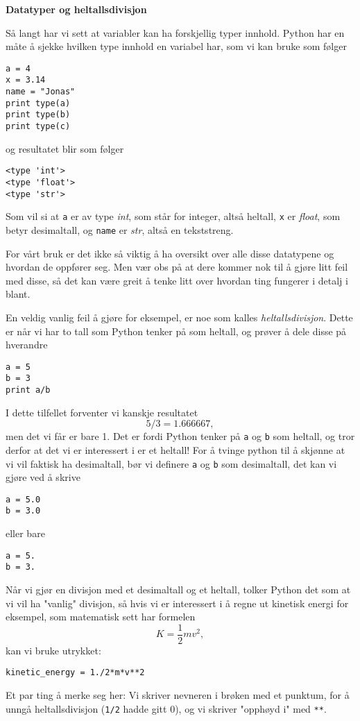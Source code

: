 \documentclass[a4paper, 11pt, notitlepage, english]{article}
\begin{document}
\textbf{Datatyper og heltallsdivisjon}

Så langt har vi sett at variabler kan ha forskjellig typer innhold. Python har en måte å sjekke hvilken type innhold en variabel har, som vi kan bruke som følger
\begin{lstlisting}
a = 4
x = 3.14
name = "Jonas"
print type(a)
print type(b)
print type(c)
\end{lstlisting}
\vspace{-0.3cm}
og resultatet blir som følger
\begin{lstlisting}
<type 'int'>
<type 'float'>
<type 'str'>
\end{lstlisting}
\vspace{-0.3cm}
Som vil si at \verb+a+ er av type \emph{int}, som står for integer, altså heltall, \verb+x+ er \emph{float}, som betyr desimaltall, og \verb+name+ er \emph{str}, altså en tekststreng.

For vårt bruk er det ikke så viktig å ha oversikt over alle disse datatypene og hvordan de oppfører seg. Men vær obs på at dere kommer nok til å gjøre litt feil med disse, så det kan være greit å tenke litt over hvordan ting fungerer i detalj i blant.

En veldig vanlig feil å gjøre for eksempel, er noe som kalles \emph{heltallsdivisjon}. Dette er når vi har to tall som Python tenker på som heltall, og prøver å dele disse på hverandre
\begin{lstlisting}
a = 5
b = 3
print a/b
\end{lstlisting}
\vspace{-0.3cm}
I dette tilfellet forventer vi kanskje resultatet
$$5/3 = 1.666667,$$
men det vi får er bare 1. Det er fordi Python tenker på \verb+a+ og \verb+b+ som heltall, og tror derfor at det vi er interessert i er et heltall! For å tvinge python til å skjønne at vi vil faktisk ha desimaltall, bør vi definere \verb+a+ og \verb+b+ som desimaltall, det kan vi gjøre ved å skrive
\begin{lstlisting}
a = 5.0
b = 3.0
\end{lstlisting}
\vspace{-0.3cm}
eller bare
\begin{lstlisting}
a = 5.
b = 3.
\end{lstlisting}
\vspace{-0.3cm}
Når vi gjør en divisjon med et desimaltall og et heltall, tolker Python det som at vi vil ha "vanlig" divisjon, så hvis vi er interessert i å regne ut kinetisk energi for eksempel, som matematisk sett har formelen
$$K = \frac{1}{2}mv^2,$$
kan vi bruke utrykket:
\begin{lstlisting}
kinetic_energy = 1./2*m*v**2
\end{lstlisting}
\vspace{-0.3cm}
Et par ting å merke seg her: Vi skriver nevneren i brøken med et punktum, for å unngå heltallsdivisjon (\verb+1/2+ hadde gitt 0), og vi skriver "opphøyd i" med \verb+**+.
\end{document}
